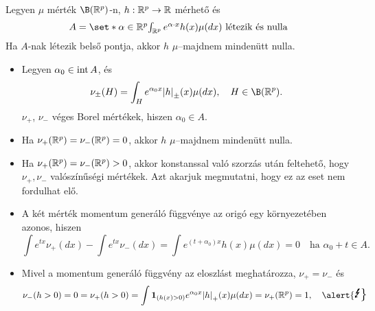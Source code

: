 \documentclass[aspectratio=169,notheorems,9pt,\option]{beamer}
\begin{document}
  \begin{frame}%
    \begin{theorem}
      Legyen $\mu$ mérték $\B (\real^p)$-n, $h:\mathbb{R}^p\to\mathbb{R}$ mérhető és 
      \begin{displaymath}\textstyle
        A=\set*{\alpha\in\real^p}{\text{$\int_{\real^p} e^{\alpha \cdot x}h (x)\mu
          (dx)$ létezik és nulla}}%
      \end{displaymath}
      Ha $A$-nak létezik belső pontja, akkor $h$ $\mu$--majdnem mindenütt nulla.
    \end{theorem}
    \begin{itemize}
    \item Legyen $\alpha_0\in\operatorname{int} A$, és
      \begin{displaymath}
        \nu_{\pm} (H)=\int_H e^{\alpha_0x}\abs*{h}_\pm (x) \mu (d x),\quad H\in\B(\real^p).
      \end{displaymath}
      $\nu_{+}$, $\nu_{-}$ véges Borel mértékek,  hiszen $\alpha_0\in A$.
    \item  Ha $\nu_{+} (\mathbb{R}^p)=\nu_{-} (\mathbb{R}^p) = 0$, akkor $h$ $\mu$--majdnem mindenütt
      nulla.
    \item Ha $\nu_{+}(\mathbb{R}^p)=\nu_{-} (\mathbb{R}^p)>0$, akkor konstanssal
      való szorzás után feltehető, hogy $\nu_{+},\nu_{-}$ valószínűségi
      mértékek. Azt akarjuk megmutatni, hogy ez az eset nem fordulhat
      elő. 
      
    \item A két mérték momentum generáló függvénye az origó egy
      környezetében azonos, hiszen
      \begin{displaymath}
        \int e^{t x}\nu_{+} (d x)-\int e^{t x}\nu_{-} (d x)=\int
        e^{(t+\alpha_0)x}h (x)\mu (d x)=0
            \quad\text{ha $\alpha_0+t\in A$.}
      \end{displaymath}
    \item Mivel a momentum generáló függvény az eloszlást meghatározza,
      $\nu_{+}=\nu_{-}$ és %
      \begin{displaymath}
        \nu_{-} (h>0)=0=\nu_{+}(h>0)=
        \int \I{h (x) >0} e^{\alpha_0 x}\abs*{h}_+ (x)\mu (d x)=
        \nu_{+} (\real^p)=1,
        \quad\text{\alert{\Large\Lightning}}
      \end{displaymath}
    \end{itemize}
  \end{frame}
  
\end{document}
